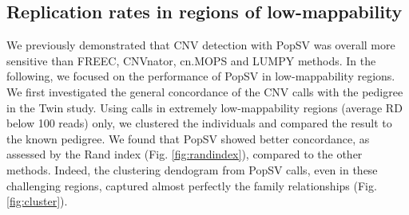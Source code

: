 \subsection*{Replication rates in regions of low-mappability}
We previously demonstrated that CNV detection with {\sf PopSV} was overall more sensitive than {\sf FREEC}\cite{Boeva2011}, {\sf CNVnator}\cite{Abyzov2011}, {\sf cn.MOPS}\cite{Klambauer2012} and {\sf LUMPY}\cite{Layer2012} methods\cite{Monlong2018}.
In the following, we focused on the performance of {\sf PopSV} in low-mappability regions.
We first investigated the general concordance of the CNV calls with the pedigree in the Twin study.
Using calls in extremely low-mappability regions (average RD below 100 reads) only, we clustered the individuals and compared the result to the known pedigree.
We found that {\sf PopSV} showed better concordance, as assessed by the Rand index (Fig. \ref{fig:randindex}), compared to the other methods.
Indeed, the clustering dendogram from {\sf PopSV} calls, even in these challenging regions, captured almost perfectly the family relationships (Fig. \ref{fig:cluster}).
